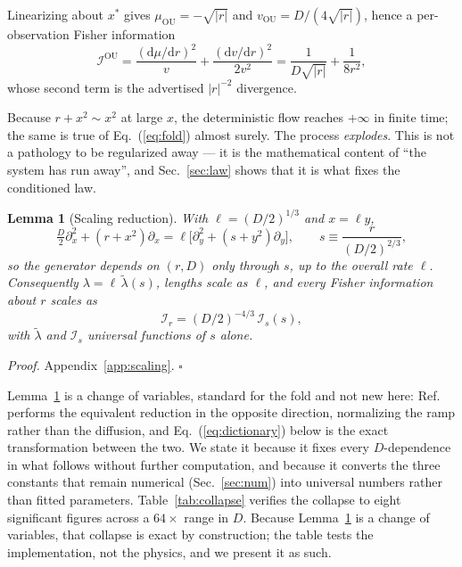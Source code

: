 \documentclass[%
 aip,
 cha,
 amsmath,amssymb,
 reprint,
 superscriptaddress,
 floatfix,
]{revtex4-2}
\newtheorem{lemma}{Lemma}
\newcommand{\dd}{\mathrm{d}}
\newcommand{\Ifish}{\mathcal{I}}
\begin{document}
Linearizing about $x^\ast$ gives $\mu_{\mathrm{OU}}=-\sqrt{|r|}$ and $v_{\mathrm{OU}}=D/(4\sqrt{|r|})$, hence a per-observation Fisher information
\begin{equation}
\label{eq:iou}
\Ifish^{\mathrm{OU}}
=\frac{(\dd\mu/\dd r)^2}{v}+\frac{(\dd v/\dd r)^2}{2v^2}
=\frac{1}{D\sqrt{|r|}}+\frac{1}{8r^2},
\end{equation}
whose second term is the advertised $|r|^{-2}$ divergence.

Because $r+x^2\sim x^2$ at large $x$, the deterministic flow reaches $+\infty$ in finite time; the same is true of Eq.~(\ref{eq:fold}) almost surely.  The process \emph{explodes}.  This is not a pathology to be regularized away --- it is the mathematical content of ``the system has run away'', and Sec.~\ref{sec:law} shows that it is what fixes the conditioned law.

\begin{lemma}[Scaling reduction]
\label{thm:scaling}
With $\ell=(D/2)^{1/3}$ and $x=\ell y$,
\begin{equation}
\label{eq:generator}
\tfrac D2\partial_x^2+(r+x^2)\partial_x
=\ell\bigl[\partial_y^2+(s+y^2)\partial_y\bigr],
\qquad s\equiv \frac{r}{(D/2)^{2/3}},
\end{equation}
so the generator depends on $(r,D)$ only through $s$, up to the overall rate $\ell$.  Consequently $\lambda=\ell\,\tilde\lambda(s)$, lengths scale as $\ell$, and every Fisher information about $r$ scales as
\begin{equation}
\label{eq:Iscale}
\Ifish_r=(D/2)^{-4/3}\,\Ifish_s(s),
\end{equation}
with $\tilde\lambda$ and $\Ifish_s$ universal functions of $s$ alone.
\end{lemma}

\noindent\textit{Proof.} Appendix~\ref{app:scaling}. $\square$

Lemma~\ref{thm:scaling} is a change of variables, standard for the fold and not new here: Ref.~\cite{HerbertBouchet2017} performs the equivalent reduction in the opposite direction, normalizing the ramp rather than the diffusion, and Eq.~(\ref{eq:dictionary}) below is the exact transformation between the two.  We state it because it fixes every $D$-dependence in what follows without further computation, and because it converts the three constants that remain numerical (Sec.~\ref{sec:num}) into universal numbers rather than fitted parameters.  Table~\ref{tab:collapse} verifies the collapse to eight significant figures across a $64\times$ range in $D$.  Because Lemma~\ref{thm:scaling} is a change of variables, that collapse is exact by construction; the table tests the implementation, not the physics, and we present it as such.
\end{document}
